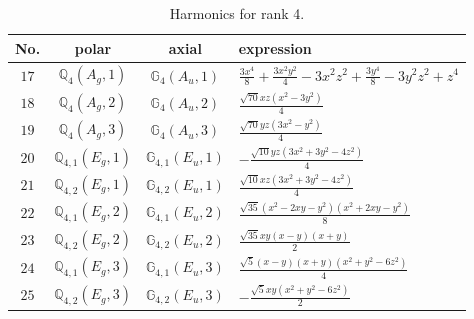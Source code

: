 \documentclass[fleqn,8pt,landscape]{jsarticle}
\begin{document}
\begin{table}[ht!]
\begin{center}
\caption{Harmonics for rank 4.}
\renewcommand{\arraystretch}{1.3}
\begin{tabular}{cccl} \hline \hline
No. & polar & axial & expression \\ \hline
$ 17 $ & $ \mathbb{Q}_{4}(A_{g},1) $ & $ \mathbb{G}_{4}(A_{u},1) $ & $ \frac{3 x^{4}}{8} + \frac{3 x^{2} y^{2}}{4} - 3 x^{2} z^{2} + \frac{3 y^{4}}{8} - 3 y^{2} z^{2} + z^{4} $ \\
$ 18 $ & $ \mathbb{Q}_{4}(A_{g},2) $ & $ \mathbb{G}_{4}(A_{u},2) $ & $ \frac{\sqrt{70} x z \left(x^{2} - 3 y^{2}\right)}{4} $ \\
$ 19 $ & $ \mathbb{Q}_{4}(A_{g},3) $ & $ \mathbb{G}_{4}(A_{u},3) $ & $ \frac{\sqrt{70} y z \left(3 x^{2} - y^{2}\right)}{4} $ \\
$ 20 $ & $ \mathbb{Q}_{4,1}(E_{g},1) $ & $ \mathbb{G}_{4,1}(E_{u},1) $ & $ - \frac{\sqrt{10} y z \left(3 x^{2} + 3 y^{2} - 4 z^{2}\right)}{4} $ \\
$ 21 $ & $ \mathbb{Q}_{4,2}(E_{g},1) $ & $ \mathbb{G}_{4,2}(E_{u},1) $ & $ \frac{\sqrt{10} x z \left(3 x^{2} + 3 y^{2} - 4 z^{2}\right)}{4} $ \\
$ 22 $ & $ \mathbb{Q}_{4,1}(E_{g},2) $ & $ \mathbb{G}_{4,1}(E_{u},2) $ & $ \frac{\sqrt{35} \left(x^{2} - 2 x y - y^{2}\right) \left(x^{2} + 2 x y - y^{2}\right)}{8} $ \\
$ 23 $ & $ \mathbb{Q}_{4,2}(E_{g},2) $ & $ \mathbb{G}_{4,2}(E_{u},2) $ & $ \frac{\sqrt{35} x y \left(x - y\right) \left(x + y\right)}{2} $ \\
$ 24 $ & $ \mathbb{Q}_{4,1}(E_{g},3) $ & $ \mathbb{G}_{4,1}(E_{u},3) $ & $ \frac{\sqrt{5} \left(x - y\right) \left(x + y\right) \left(x^{2} + y^{2} - 6 z^{2}\right)}{4} $ \\
$ 25 $ & $ \mathbb{Q}_{4,2}(E_{g},3) $ & $ \mathbb{G}_{4,2}(E_{u},3) $ & $ - \frac{\sqrt{5} x y \left(x^{2} + y^{2} - 6 z^{2}\right)}{2} $ \\
 \hline \hline
\end{tabular}
\end{center}
\end{table}
\end{document}
